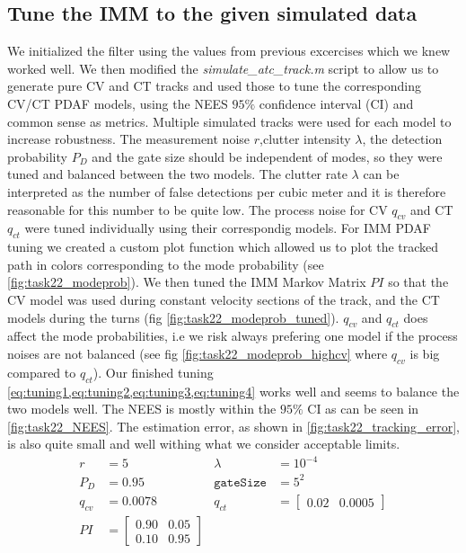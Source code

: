 \subsection{Tune the IMM to the given simulated data}

We initialized the filter using the values from previous excercises which we knew worked well. We then modified the \textit{simulate\_atc\_track.m} script to allow us to generate pure CV and CT tracks and used those to tune the corresponding CV/CT PDAF models, using the NEES $95 \%$ confidence interval (CI) and common sense as metrics. Multiple simulated tracks were used for each model to increase robustness. The measurement noise $r$,clutter intensity $\lambda$, the detection probability $P_D$ and the gate size should be independent of modes, so they were tuned and balanced between the two models. The clutter rate $\lambda$ can be interpreted as the number of false detections per cubic meter and it is therefore reasonable for this number to be quite low. The process noise for CV $q_{cv}$ and CT $q_{ct}$ were tuned individually using their correspondig models. For IMM PDAF tuning we created a custom plot function which allowed us to plot the tracked path in colors corresponding to the mode probability (see \cref{fig:task22_modeprob}). We then tuned the IMM Markov Matrix $PI$ so that the CV model was used during constant velocity sections of the track, and the CT models during the turns (fig \ref{fig:task22_modeprob_tuned}). $q_{cv}$ and $q_{ct}$ does affect the mode probabilities, i.e we risk always prefering one model if the process noises are not balanced (see fig \ref{fig:task22_modeprob_highcv} where $q_{cv}$ is big compared to $q_{ct}$). Our finished tuning \cref{eq:tuning1,eq:tuning2,eq:tuning3,eq:tuning4} works well and seems to balance the two models well. The NEES is mostly within the $95\%$ CI as can be seen in \cref{fig:task22_NEES}. The estimation error, as shown in \cref{fig:task22_tracking_error}, is also quite small and well withing what we consider acceptable limits.
\begin{align}
        r &= 5 & \lambda &= 10^{-4} \label{eq:tuning1} \\ 
        P_D &= 0.95 & \texttt{gateSize} &= 5^2 \label{eq:tuning2} \\
        q_{cv} &= 0.0078  & q_{ct} &= \begin{bmatrix}0.02 & 0.0005\end{bmatrix} \label{eq:tuning3} \\
        PI &= \begin{bmatrix}0.90 & 0.05 \\ 0.10 & 0.95\end{bmatrix} \label{eq:tuning4}
\end{align}

